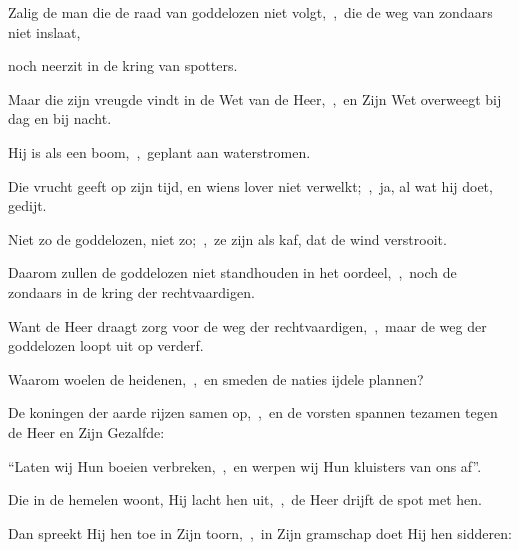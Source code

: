 \documentclass[12pt,twoside,a5paper]{article}
\begin{document}





\begin{halfparskip}
   Zalig de man die de raad van goddelozen niet volgt,~\sep\ die de weg van zondaars niet inslaat,


  noch neerzit in de kring van spotters.

  Maar die zijn vreugde vindt in de Wet van de Heer,~\sep\ en Zijn Wet overweegt bij dag en bij nacht.

  Hij is als een boom,~\sep\ geplant aan waterstromen.

  Die vrucht geeft op zijn tijd, en wiens lover niet verwelkt;~\sep\ ja, al wat hij doet, gedijt.

  Niet zo de goddelozen, niet zo;~\sep\ ze zijn als kaf, dat de wind verstrooit.

  Daarom zullen de goddelozen niet standhouden in het oordeel,~\sep\ noch de zondaars in de kring der
  rechtvaardigen.

  Want de Heer draagt zorg voor de weg der rechtvaardigen,~\sep\ maar de weg der goddelozen loopt uit op verderf.

   Waarom woelen de heidenen,~\sep\ en smeden de naties ijdele plannen?

  De koningen der aarde rijzen samen op,~\sep\ en de vorsten spannen tezamen tegen de Heer en Zijn Gezalfde:

  ``Laten wij Hun boeien verbreken,~\sep\ en werpen wij Hun kluisters van ons af''.

  Die in de hemelen woont, Hij lacht hen uit,~\sep\ de Heer drijft de spot met hen.

  Dan spreekt Hij hen toe in Zijn toorn,~\sep\ in Zijn gramschap doet Hij hen sidderen:


\end{halfparskip}
\end{document}
